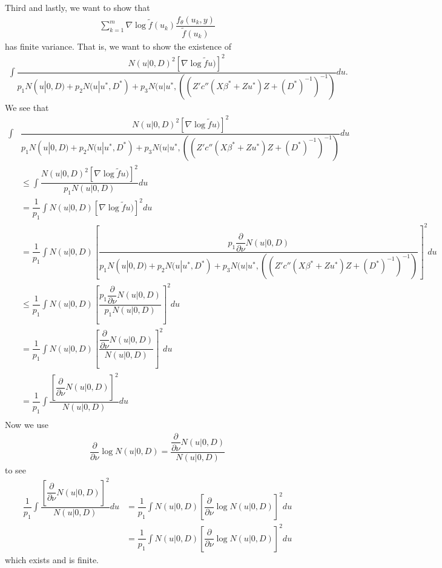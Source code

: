 \documentclass{article}
\begin{document}
Third and lastly, we want to show that 
\begin{align}
\sum_{k=1}^m \nabla \log \tilde{f} (u_k) \dfrac{f_\theta(u_k,y)}{\tilde{f}(u_k)}
\end{align}
 has finite variance. That is, we want to show the existence of
\begin{align}
\int \dfrac{N(u|0,D)^2 \left[\nabla \log \tilde{f}u) \right]^2}{p_1 N(u|0,D)+p_2 N(u|u^*, D^*) + p_3 N(u|u^*, ((Z'  c''(X \beta^*+Zu^*) Z +(D^*)^{-1}   )^{-1})} du.
\end{align}
We see that
\begin{align}
\int& \dfrac{N(u|0,D)^2 \left[\nabla \log \tilde{f}u) \right]^2}{p_1 N(u|0,D)+p_2 N(u|u^*, D^*) + p_3 N(u|u^*, ((Z'  c''(X \beta^*+Zu^*) Z +(D^*)^{-1}   )^{-1})} du\\
&\leq  \int \dfrac{N(u|0,D)^2 \left[\nabla \log \tilde{f}u) \right]^2}{p_1 N(u|0,D)} du\\
&= \dfrac{1}{p_1} \int N(u|0,D) \left[\nabla \log \tilde{f}u) \right]^2 du\\
&=\dfrac{1}{p_1} \int N(u|0,D) \left[  \dfrac{p_1 \dfrac{\partial}{\partial \nu} N(u|0,D)}{p_1 N(u|0,D)+p_2 N(u|u^*,D^*)+p_3 N(u|u^*, ((Z'  c''(X \beta^*+Zu^*) Z +(D^*)^{-1}   )^{-1})}   \right]^2 du\\
&\leq\dfrac{1}{p_1} \int N(u|0,D) \left[  \dfrac{p_1 \dfrac{\partial}{\partial \nu} N(u|0,D)}{p_1 N(u|0,D)}   \right]^2 du\\
&=\dfrac{1}{p_1} \int N(u|0,D) \left[  \dfrac{ \dfrac{\partial}{\partial \nu} N(u|0,D)}{ N(u|0,D)}   \right]^2 du\\
&= \dfrac{1}{p_1} \int \dfrac{\left[ \dfrac{\partial}{\partial \nu} N(u|0,D)  \right]^2}{N(u|0,D)} du \\
\end{align}
Now we use
\begin{align}
\dfrac{\partial}{\partial \nu} \log N(u|0,D) = \dfrac{\dfrac{\partial}{\partial \nu}  N(u|0,D)}{N(u|0,D)}
\end{align}
to see
\begin{align}
 \dfrac{1}{p_1} \int \dfrac{\left[ \dfrac{\partial}{\partial \nu} N(u|0,D)  \right]^2}{N(u|0,D)} du &=\dfrac{1}{p_1} \int  N(u|0,D) \left[ \dfrac{\partial}{\partial \nu} \log N(u|0,D)  \right]^2 du \\
&= \dfrac{1}{p_1} \int  N(u|0,D) \left[ \dfrac{\partial}{\partial \nu} \log N(u|0,D)  \right]^2 du 
\end{align}
which exists and is finite.
\end{document}
